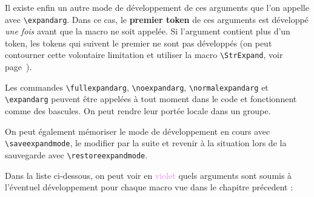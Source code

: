 \documentclass[a4paper,10pt]{article}
\newcommand\verbinline{\lstinline[basicstyle=\normalsize\ttfamily]}
\begin{document}
Il existe enfin un autre mode de développement de ces arguments que l'on appelle avec \verbinline|\expandarg|. Dans ce cas, le \textbf{premier token} de ces arguments est développé \emph{une fois} avant que la macro ne soit appelée. Si l'argument contient plus d'un token, les tokens qui suivent le premier ne sont pas développés (on peut contourner cette volontaire limitation et utiliser la macro \verbinline|\StrExpand|, voir page~\pageref{scancs}).\medskip

Les commandes \verbinline|\fullexpandarg|, \verbinline|\noexpandarg|, \verbinline|\normalexpandarg| et \verbinline|\expandarg| peuvent être appelées à tout moment dans le code et fonctionnent comme des bascules. On peut rendre leur portée locale dans un groupe.\medskip

On peut également mémoriser le mode de développement en cours avec \verbinline|\saveexpandmode|, le modifier par la suite et revenir à la situation lors de la sauvegarde avec \verbinline|\restoreexpandmode|.\medskip

Dans la liste ci-dessous, on peut voir en \textcolor{violet}{violet} quels arguments sont soumis à l'éventuel développement pour chaque macro vue dans le chapitre précedent :
\end{document}
